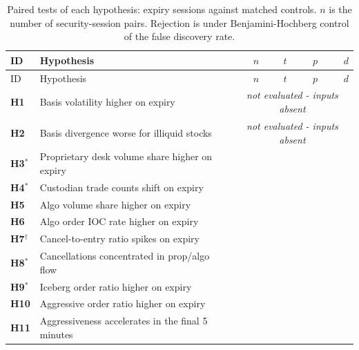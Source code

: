 \documentclass[11pt,a4paper]{article}
\begin{document}
\begin{longtable}{p{0.7cm} p{5.4cm} r r r r}
\caption{Paired tests of each hypothesis: expiry sessions against matched controls. $n$ is the number of security-session pairs. Rejection is under Benjamini-Hochberg control of the false discovery rate.}\label{tab:tests}\\
\toprule
ID & Hypothesis & $n$ & $t$ & $p$ & $d$ \\
\midrule
\endfirsthead
\toprule
ID & Hypothesis & $n$ & $t$ & $p$ & $d$ \\
\midrule
\endhead
\bottomrule
\endfoot
\bottomrule
\endlastfoot
\textbf{H1} & Basis volatility higher on expiry & \multicolumn{4}{c}{\textit{not evaluated - inputs absent}} \\
\textbf{H2} & Basis divergence worse for illiquid stocks & \multicolumn{4}{c}{\textit{not evaluated - inputs absent}} \\
\textbf{H3}$^{\ast}$ & Proprietary desk volume share higher on expiry & \HHThreeNPairs{} & \HHThreeTestStat{} & \HHThreePValue{} & \HHThreeEffectSizeCohenD{} \\
\textbf{H4}$^{\ast}$ & Custodian trade counts shift on expiry & \HHFourNPairs{} & \HHFourTestStat{} & \HHFourPValue{} & \HHFourEffectSizeCohenD{} \\
\textbf{H5} & Algo volume share higher on expiry & \HHFiveNPairs{} & \HHFiveTestStat{} & \HHFivePValue{} & \HHFiveEffectSizeCohenD{} \\
\textbf{H6} & Algo order IOC rate higher on expiry & \HHSixNPairs{} & \HHSixTestStat{} & \HHSixPValue{} & \HHSixEffectSizeCohenD{} \\
\textbf{H7}$^{\dagger}$ & Cancel-to-entry ratio spikes on expiry & \HHSevenNPairs{} & \HHSevenTestStat{} & \HHSevenPValue{} & \HHSevenEffectSizeCohenD{} \\
\textbf{H8}$^{\ast}$ & Cancellations concentrated in prop/algo flow & \HHEightNPairs{} & \HHEightTestStat{} & \HHEightPValue{} & \HHEightEffectSizeCohenD{} \\
\textbf{H9}$^{\ast}$ & Iceberg order ratio higher on expiry & \HHNineNPairs{} & \HHNineTestStat{} & \HHNinePValue{} & \HHNineEffectSizeCohenD{} \\
\textbf{H10} & Aggressive order ratio higher on expiry & \HHOneZeroNPairs{} & \HHOneZeroTestStat{} & \HHOneZeroPValue{} & \HHOneZeroEffectSizeCohenD{} \\
\textbf{H11} & Aggressiveness accelerates in the final 5 minutes & \HHOneOneNPairs{} & \HHOneOneTestStat{} & \HHOneOnePValue{} & \HHOneOneEffectSizeCohenD{} \\

\end{longtable}
\end{document}
